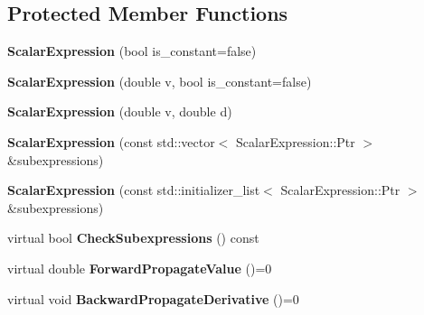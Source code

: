 \subsection*{Protected Member Functions}
\begin{DoxyCompactItemize}
\item 
\hypertarget{classautodifk_1_1reverse_1_1_scalar_expression_ad6e48eecd2f272377d36ff0c96c3d6df}{{\bfseries Scalar\-Expression} (bool is\-\_\-constant=false)}\label{classautodifk_1_1reverse_1_1_scalar_expression_ad6e48eecd2f272377d36ff0c96c3d6df}

\item 
\hypertarget{classautodifk_1_1reverse_1_1_scalar_expression_a6e25133ba71ffb651898c4a1724086fb}{{\bfseries Scalar\-Expression} (double v, bool is\-\_\-constant=false)}\label{classautodifk_1_1reverse_1_1_scalar_expression_a6e25133ba71ffb651898c4a1724086fb}

\item 
\hypertarget{classautodifk_1_1reverse_1_1_scalar_expression_ac4954f13405d688c716d7bb79537e86f}{{\bfseries Scalar\-Expression} (double v, double d)}\label{classautodifk_1_1reverse_1_1_scalar_expression_ac4954f13405d688c716d7bb79537e86f}

\item 
\hypertarget{classautodifk_1_1reverse_1_1_scalar_expression_a80fb01a8e7e88503dd543fc3ac5b3939}{{\bfseries Scalar\-Expression} (const std\-::vector$<$ Scalar\-Expression\-::\-Ptr $>$ \&subexpressions)}\label{classautodifk_1_1reverse_1_1_scalar_expression_a80fb01a8e7e88503dd543fc3ac5b3939}

\item 
\hypertarget{classautodifk_1_1reverse_1_1_scalar_expression_a86a8f5a65b0d6bb0f0ef0a48dab651eb}{{\bfseries Scalar\-Expression} (const std\-::initializer\-\_\-list$<$ Scalar\-Expression\-::\-Ptr $>$ \&subexpressions)}\label{classautodifk_1_1reverse_1_1_scalar_expression_a86a8f5a65b0d6bb0f0ef0a48dab651eb}

\item 
\hypertarget{classautodifk_1_1reverse_1_1_scalar_expression_a7cf1b9db84a62e39294c19fab45958ef}{virtual bool {\bfseries Check\-Subexpressions} () const }\label{classautodifk_1_1reverse_1_1_scalar_expression_a7cf1b9db84a62e39294c19fab45958ef}

\item 
\hypertarget{classautodifk_1_1reverse_1_1_scalar_expression_a358b7c4f8e2425d0e11c0e37c06ff665}{virtual double {\bfseries Forward\-Propagate\-Value} ()=0}\label{classautodifk_1_1reverse_1_1_scalar_expression_a358b7c4f8e2425d0e11c0e37c06ff665}

\item 
\hypertarget{classautodifk_1_1reverse_1_1_scalar_expression_aa25dc105d7ef6eb766383b5b0973957b}{virtual void {\bfseries Backward\-Propagate\-Derivative} ()=0}\label{classautodifk_1_1reverse_1_1_scalar_expression_aa25dc105d7ef6eb766383b5b0973957b}

\end{DoxyCompactItemize}
